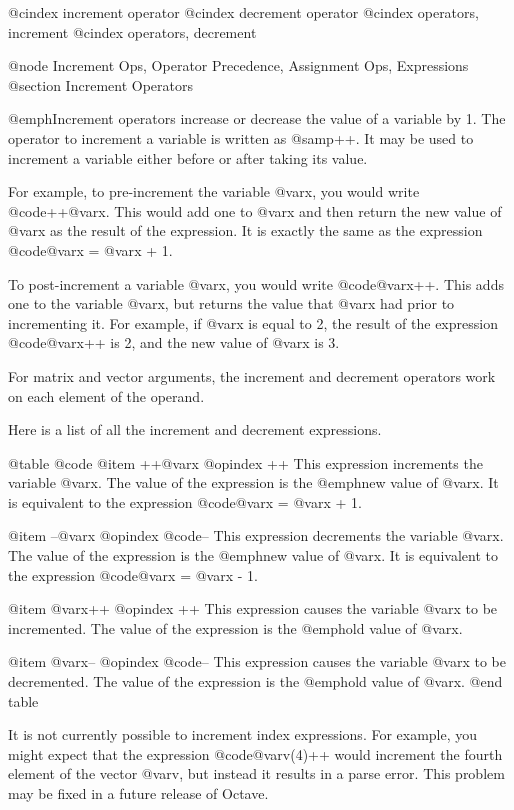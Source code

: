 @cindex increment operator
@cindex decrement operator
@cindex operators, increment
@cindex operators, decrement

@node Increment Ops, Operator Precedence, Assignment Ops, Expressions
@section Increment Operators

@emph{Increment operators} increase or decrease the value of a variable
by 1.  The operator to increment a variable is written as @samp{++}.  It
may be used to increment a variable either before or after taking its
value.

For example, to pre-increment the variable @var{x}, you would write
@code{++@var{x}}.  This would add one to @var{x} and then return the new
value of @var{x} as the result of the expression.  It is exactly the
same as the expression @code{@var{x} = @var{x} + 1}.

To post-increment a variable @var{x}, you would write @code{@var{x}++}.
This adds one to the variable @var{x}, but returns the value that
@var{x} had prior to incrementing it.  For example, if @var{x} is equal
to 2, the result of the expression @code{@var{x}++} is 2, and the new
value of @var{x} is 3.

For matrix and vector arguments, the increment and decrement operators
work on each element of the operand.

Here is a list of all the increment and decrement expressions.

@table @code
@item ++@var{x}
@opindex ++
This expression increments the variable @var{x}.  The value of the
expression is the @emph{new} value of @var{x}.  It is equivalent to the
expression @code{@var{x} = @var{x} + 1}.

@item --@var{x}
@opindex @code{--}
This expression decrements the variable @var{x}.  The value of the
expression is the @emph{new} value of @var{x}.  It is equivalent to the
expression @code{@var{x} = @var{x} - 1}.

@item @var{x}++
@opindex ++
This expression causes the variable @var{x} to be incremented.  The
value of the expression is the @emph{old} value of @var{x}.

@item @var{x}--
@opindex @code{--}
This expression causes the variable @var{x} to be decremented.  The
value of the expression is the @emph{old} value of @var{x}.
@end table

It is not currently possible to increment index expressions.  For
example, you might expect that the expression @code{@var{v}(4)++} would
increment the fourth element of the vector @var{v}, but instead it
results in a parse error.  This problem may be fixed in a future
release of Octave.

